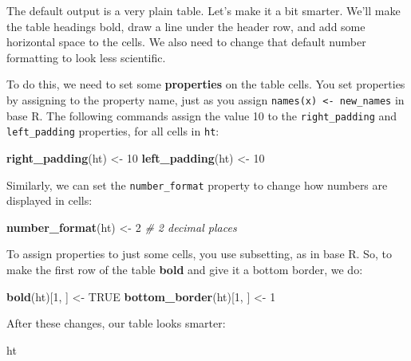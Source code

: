 \documentclass[]{article}
\newenvironment{Shaded}{\begin{snugshade}}{\end{snugshade}}
\newcommand{\KeywordTok}[1]{\textcolor[rgb]{0.13,0.29,0.53}{\textbf{#1}}}
\newcommand{\DecValTok}[1]{\textcolor[rgb]{0.00,0.00,0.81}{#1}}
\newcommand{\StringTok}[1]{\textcolor[rgb]{0.31,0.60,0.02}{#1}}
\newcommand{\CommentTok}[1]{\textcolor[rgb]{0.56,0.35,0.01}{\textit{#1}}}
\newcommand{\OtherTok}[1]{\textcolor[rgb]{0.56,0.35,0.01}{#1}}
\newcommand{\NormalTok}[1]{#1}
\begin{document}
The default output is a very plain table. Let's make it a bit smarter.
We'll make the table headings bold, draw a line under the header row,
and add some horizontal space to the cells. We also need to change that
default number formatting to look less scientific.

To do this, we need to set some \textbf{properties} on the table cells.
You set properties by assigning to the property name, just as you assign
\texttt{names(x)\ \textless{}-\ new\_names} in base R. The following
commands assign the value 10 to the \texttt{right\_padding} and
\texttt{left\_padding} properties, for all cells in \texttt{ht}:

\begin{Shaded}
\begin{Highlighting}[]
\KeywordTok{right_padding}\NormalTok{(ht) <-}\StringTok{ }\DecValTok{10}
\KeywordTok{left_padding}\NormalTok{(ht)  <-}\StringTok{ }\DecValTok{10}
\end{Highlighting}
\end{Shaded}

\FloatBarrier

Similarly, we can set the \texttt{number\_format} property to change how
numbers are displayed in cells:

\begin{Shaded}
\begin{Highlighting}[]
\KeywordTok{number_format}\NormalTok{(ht) <-}\StringTok{ }\DecValTok{2}    \CommentTok{# 2 decimal places}
\end{Highlighting}
\end{Shaded}

\FloatBarrier

To assign properties to just some cells, you use subsetting, as in base
R. So, to make the first row of the table \textbf{bold} and give it a
bottom border, we do:

\begin{Shaded}
\begin{Highlighting}[]
\KeywordTok{bold}\NormalTok{(ht)[}\DecValTok{1}\NormalTok{, ]          <-}\StringTok{ }\OtherTok{TRUE}
\KeywordTok{bottom_border}\NormalTok{(ht)[}\DecValTok{1}\NormalTok{, ] <-}\StringTok{ }\DecValTok{1}
\end{Highlighting}
\end{Shaded}

\FloatBarrier

After these changes, our table looks smarter:

\begin{Shaded}
\begin{Highlighting}[]
\NormalTok{ht}
\end{Highlighting}
\end{Shaded}
\end{document}
